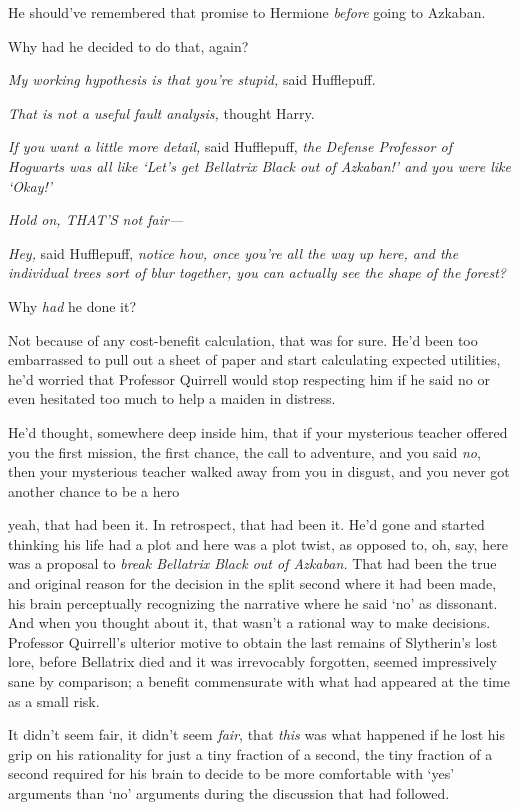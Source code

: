 He should've remembered that promise to Hermione \emph{before} going to Azkaban.

Why had he decided to do that, again?

\emph{My working hypothesis is that you're stupid,} said Hufflepuff.

\emph{That is not a useful fault analysis,} thought Harry.

\emph{If you want a little more detail,} said Hufflepuff, \emph{the Defense
Professor of Hogwarts was all like `Let's get Bellatrix Black out of Azkaban!'
and you were like `Okay!'}

\emph{Hold on, THAT'S not fair---}

\emph{Hey,} said Hufflepuff, \emph{notice how, once you're all the way up here,
and the individual trees sort of blur together, you can actually see the shape
of the forest?}

Why \emph{had} he done it{\el}?

Not because of any cost-benefit calculation, that was for sure. He'd been too
embarrassed to pull out a sheet of paper and start calculating expected
utilities, he'd worried that Professor Quirrell would stop respecting him if he
said no or even hesitated too much to help a maiden in distress.

He'd thought, somewhere deep inside him, that if your mysterious teacher
offered you the first mission, the first chance, the call to adventure, and you
said \emph{no}, then your mysterious teacher walked away from you in disgust,
and you never got another chance to be a hero{\el}

{\el} yeah, that had been it. In retrospect, that had been it. He'd gone and
started thinking his life had a plot and here was a plot twist, as opposed to,
oh, say, here was a proposal to \emph{break Bellatrix Black out of Azkaban.}
That had been the true and original reason for the decision in the split second
where it had been made, his brain perceptually recognizing the narrative where
he said `no' as dissonant. And when you thought about it, that wasn't a
rational way to make decisions. Professor Quirrell's ulterior motive to obtain
the last remains of Slytherin's lost lore, before Bellatrix died and it was
irrevocably forgotten, seemed impressively sane by comparison; a benefit
commensurate with what had appeared at the time as a small risk.

It didn't seem fair, it didn't seem \emph{fair}, that \emph{this} was what
happened if he lost his grip on his rationality for just a tiny fraction of a
second, the tiny fraction of a second required for his brain to decide to be
more comfortable with `yes' arguments than `no' arguments during the discussion
that had followed.

